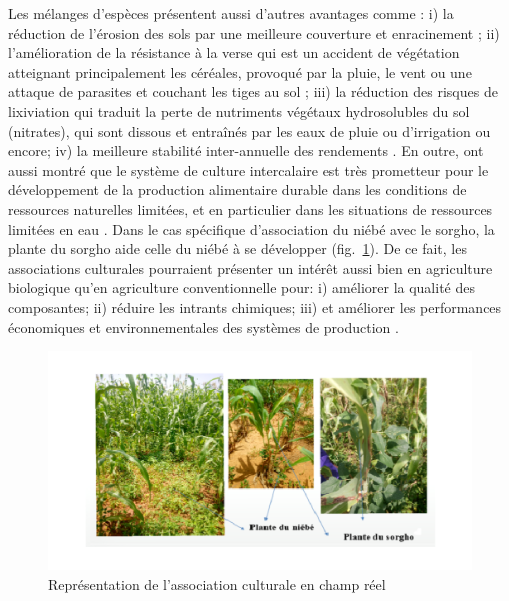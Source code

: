 \documentclass[a4paper,11pt]{article}
\begin{document}
Les mélanges d'espèces présentent aussi d'autres avantages comme : i)
la réduction de l'érosion des sols par une meilleure couverture et
enracinement \cite{Zougmore_1998}; ii) l'amélioration de la résistance
à la verse qui est un accident de végétation atteignant principalement
les céréales, provoqué par la pluie, le vent ou une attaque de
parasites et couchant les tiges au sol \cite{Anil_1998}; iii) la
réduction des risques de lixiviation qui traduit la perte de
nutriments végétaux hydrosolubles du sol (nitrates), qui sont dissous
et entraînés par les eaux de pluie ou d'irrigation
\cite{CorreHellou_2005} ou encore; iv) la meilleure stabilité
inter-annuelle des rendements \cite{Lithourgidis_2006}. En outre,
\citeauthor{Chu_2004} \citeyear{Chu_2004} ont aussi montré que le
système de culture intercalaire est très prometteur pour le
développement de la production alimentaire durable dans les conditions
de ressources naturelles limitées, et en particulier dans les
situations de ressources limitées en eau \cite{Tsubo_2005}. Dans le
cas spécifique d'association du niébé avec le sorgho, la plante du
sorgho aide celle du niébé à se développer
(fig.~\ref{fig:association_culturale}). De ce fait, les associations
culturales pourraient présenter un intérêt aussi bien en agriculture
biologique qu'en agriculture conventionnelle pour: i) améliorer la
qualité des composantes; ii) réduire les intrants chimiques; iii) et
améliorer les performances économiques et environnementales des
systèmes de production \cite{Koulibi_FideleZONGO}.

\begin{figure}
  \begin{center}
    \includegraphics[width=16cm]{images/AssociationChampReel}
  \end{center}
  \caption{Représentation de l'association culturale en champ réel}
  \label{fig:association_culturale}
\end{figure}
\end{document}
